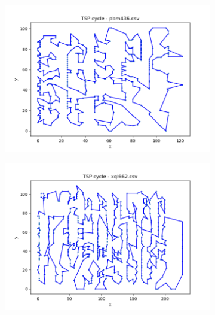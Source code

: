 \documentclass[12pt]{article}
\begin{document}
        \begin{figure}[htpb]
        \centering
            \begin{subfigure}[b]{0.475\textwidth}
                \includegraphics[width=\linewidth]{img/pbm436.png}
            \end{subfigure}
            \hfill
            \begin{subfigure}[b]{0.475\textwidth}
                \includegraphics[width=\linewidth]{img/xql662.png}
            \end{subfigure}
            \begin{subfigure}[b]{0.475\textwidth}

\end{subfigure}
\end{figure}
\end{document}
